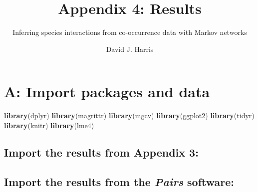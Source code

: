 \documentclass[11pt,]{article}
\title{Appendix 4: Results}
\subtitle{Inferring species interactions from co-occurrence data with Markov
networks}
\author{David J. Harris}
\date{}
\newenvironment{Shaded}{\begin{snugshade}}{\end{snugshade}}
\newcommand{\KeywordTok}[1]{\textcolor[rgb]{0.13,0.29,0.53}{\textbf{{#1}}}}
\newcommand{\DataTypeTok}[1]{\textcolor[rgb]{0.13,0.29,0.53}{{#1}}}
\newcommand{\StringTok}[1]{\textcolor[rgb]{0.31,0.60,0.02}{{#1}}}
\newcommand{\OtherTok}[1]{\textcolor[rgb]{0.56,0.35,0.01}{{#1}}}
\newcommand{\NormalTok}[1]{{#1}}
\begin{document}
\maketitle

\section{A: Import packages and data}\label{a-import-packages-and-data}

\begin{Shaded}
\begin{Highlighting}[]
\KeywordTok{library}\NormalTok{(dplyr)}
\KeywordTok{library}\NormalTok{(magrittr)}
\KeywordTok{library}\NormalTok{(mgcv)}
\KeywordTok{library}\NormalTok{(ggplot2)}
\KeywordTok{library}\NormalTok{(tidyr)}
\KeywordTok{library}\NormalTok{(knitr)}
\KeywordTok{library}\NormalTok{(lme4)}
\end{Highlighting}
\end{Shaded}

\subsection{Import the results from Appendix
3:}\label{import-the-results-from-appendix-3}

\begin{Shaded}
\end{Shaded}

\subsection{\texorpdfstring{Import the results from the \emph{Pairs}
software:}{Import the results from the Pairs software:}}\label{import-the-results-from-the-pairs-software}
\end{document}
